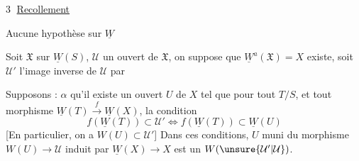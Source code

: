 \textcircled{3} \uline{Recollement}

Aucune hypothèse sur $\underline W$

 
Soit $\mathfrak X$ sur $\underline W(S)$,
$\mathcal U$ un ouvert de $\mathfrak X$, on suppose que $\underline W^a(\mathfrak X)=X$ existe, soit $\mathcal U'$ l'image inverse de $\mathcal U$ par

Supposons : \textcircled{$\alpha$} qu'il existe un ouvert $U$ de $X$ tel que pour tout $T/S$, et tout morphisme $\underline W(T)\xrightarrow{f}\underline W(X)$, la condition
\[
f(\underline W(T))\subset\mathcal U'\Longleftrightarrow f(\underline W(T))\subset\underline W(U)
\]
[En particulier, on a $W(U)\subset\mathcal U'$]
Dans ces conditions, $U$ muni du morphisme $W(U)\to\mathcal U$ induit par $\underline W(X)\to X$ est un $W(\unsure{\mathcal U'|\mathcal U})$.
